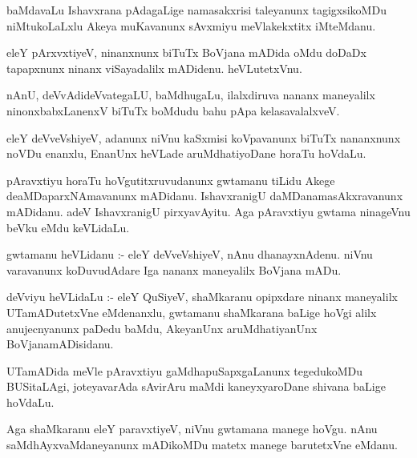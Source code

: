 \documentclass{article}
\begin{document}
\begin{mn}
baMdavaLu  Ishavxrana  pAdagaLige  namasakxrisi  taleyanunx  tagigxsikoMDu   niMtukoLaLxlu  Akeya  
muKavanunx  sAvxmiyu  meVlakekxtitx  iMteMdanu.
\end{mn}

\begin{mn}
eleY  pArxvxtiyeV,  ninanxnunx  biTuTx  BoVjana mADida  oMdu  doDaDx  tapapxnunx  ninanx  viSayadalilx  
mADidenu.  heVLutetxVnu.
\end{mn}

\begin{mn}
nAnU,  deVvAdideVvategaLU,  baMdhugaLu,  ilalxdiruva  nananx  maneyalilx  ninonxbabxLanenxV  biTuTx  
boMdudu  bahu  pApa  kelasavalalxveV.
\end{mn}

\begin{mn}
eleY  deVveVshiyeV,  adanunx  niVnu  kaSxmisi  koVpavanunx  biTuTx  nananxnunx  noVDu  enanxlu,  
EnanUnx  heVLade  aruMdhatiyoDane  horaTu hoVdaLu.
\end{mn}

\begin{mn}
pAravxtiyu  horaTu  hoVgutitxruvudanunx  gwtamanu  tiLidu  Akege  deaMDaparxNAmavanunx  mADidanu.  
IshavxranigU  daMDanamasAkxravanunx  mADidanu.  adeV  IshavxranigU  pirxyavAyitu.  Aga  pAravxtiyu  
gwtama  ninageVnu  beVku  eMdu  keVLidaLu.
\end{mn}

\begin{mn}
gwtamanu  heVLidanu :- eleY  deVveVshiyeV,  nAnu  dhanayxnAdenu.  niVnu  varavanunx  koDuvudAdare  
Iga  nananx  maneyalilx  BoVjana mADu.
\end{mn}

\begin{mn}
deVviyu  heVLidaLu :- eleY  QuSiyeV,  shaMkaranu  opipxdare  ninanx  maneyalilx  UTamADutetxVne  
eMdenanxlu,  gwtamanu  shaMkarana  baLige  hoVgi  alilx  anujecnyanunx  paDedu  baMdu,  AkeyanUnx  
aruMdhatiyanUnx  BoVjanamADisidanu.
\end{mn}

\begin{mn}
UTamADida  meVle  pAravxtiyu  gaMdhapuSapxgaLanunx  tegedukoMDu  BUSitaLAgi,  joteyavarAda  sAvirAru  
maMdi  kaneyxyaroDane  shivana  baLige  hoVdaLu.
\end{mn}

\begin{mn}
Aga  shaMkaranu  eleY  paravxtiyeV,  niVnu  gwtamana  manege  hoVgu.  nAnu  saMdhAyxvaMdaneyanunx  
mADikoMDu  matetx  manege  barutetxVne  eMdanu.
\end{mn}
\end{document}
